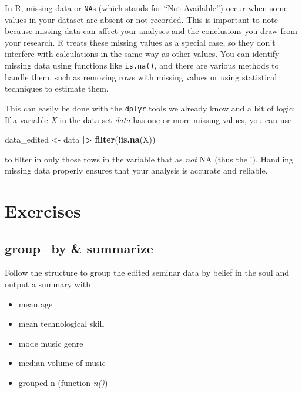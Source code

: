 \documentclass[
]{book}
\newenvironment{Shaded}{\begin{snugshade}}{\end{snugshade}}
\newcommand{\FunctionTok}[1]{\textcolor[rgb]{0.13,0.29,0.53}{\textbf{#1}}}
\newcommand{\NormalTok}[1]{#1}
\newcommand{\OtherTok}[1]{\textcolor[rgb]{0.56,0.35,0.01}{#1}}
\newcommand{\SpecialCharTok}[1]{\textcolor[rgb]{0.81,0.36,0.00}{\textbf{#1}}}
\providecommand{\tightlist}{%
  \setlength{\itemsep}{0pt}\setlength{\parskip}{0pt}}
\begin{document}
In R, missing data or \texttt{NA}s (which stands for ``Not Available'') occur when some values in your dataset are absent or not recorded.
This is important to note because missing data can affect your analyses and the conclusions you draw from your research.
R treats these missing values as a special case, so they don't interfere with calculations in the same way as other values.
You can identify missing data using functions like \texttt{is.na()}, and there are various methods to handle them, such as removing rows with missing values or using statistical techniques to estimate them.

This can easily be done with the \texttt{dplyr} tools we already know and a bit of logic:
If a variable \emph{X} in the data set \emph{data} has one or more missing values, you can use

\begin{Shaded}
\begin{Highlighting}[]
\NormalTok{data\_edited }\OtherTok{\textless{}{-}}\NormalTok{ data }\SpecialCharTok{|\textgreater{}} 
  \FunctionTok{filter}\NormalTok{(}\SpecialCharTok{!}\FunctionTok{is.na}\NormalTok{(X))}
\end{Highlighting}
\end{Shaded}

to filter in only those rows in the variable that as \emph{not} NA (thus the !).
Handling missing data properly ensures that your analysis is accurate and reliable.

\section*{Exercises}\label{exercises-2}

\subsection*{group\_by \& summarize}\label{group_by-summarize-2}

Follow the structure to group the edited seminar data by belief in the soul and output a summary with

\begin{itemize}
\tightlist
\item
  mean age
\item
  mean technological skill
\item
  mode music genre
\item
  median volume of music
\item
  grouped n (function \emph{n()})
\end{itemize}
\end{document}
